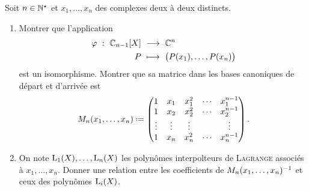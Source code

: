 \begin{exercice}
    Soit $n \in \mathbb{N}^\star$ et $x_1, \dots, x_n$ des complexes deux à deux distincts.
    \begin{enumerate}
        \item Montrer que l'application
        \begin{alignat*}{2}
            \varphi\ :\ \mathbb{C}_{n-1}[X]\ &\longrightarrow\ \mathbb{C}^n\\
            P\ &\longmapsto\ \big( P(x_1), \dots, P(x_n) \big)
        \end{alignat*}
        est un isomorphisme. Montrer que sa matrice dans les bases canoniques de départ et d'arrivée est 
        $$
        M_n(x_1, \dots, x_n) \defeq
        \begin{pmatrix}
            1 & x_1 & x_1^2 & \cdots & x_1^{n-1} \\
            1 & x_2 & x_2^2 & \cdots & x_2^{n-1} \\
            \vdots & \vdots & \vdots & & \vdots \\
            1 & x_n & x_n^2 & \cdots & x_n^{n-1}
        \end{pmatrix}.
        $$
        \item On note $\mathrm{L}_1(X), \dots, \mathrm{L}_n(X)$ les polynômes interpolteurs de \textsc{Lagrange} associés à $x_1, \dots, x_n$. Donner une relation entre les coefficients de $M_n(x_1, \dots, x_n)^{-1}$ et ceux des polynômes $\mathrm{L}_i(X)$.
    \end{enumerate}
\end{exercice}